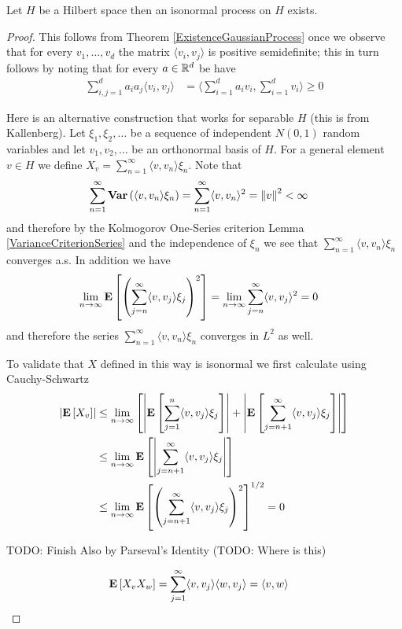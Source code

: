 \begin{prop}\label{ExistenceIsonormalProcess}Let $H$ be a Hilbert space then an isonormal process on $H$ exists.
\end{prop}
\begin{proof}
This follows from Theorem \ref{ExistenceGaussianProcess} once we observe that for every $v_1, \dotsc, v_d$ the matrix $\langle v_i, v_j \rangle$ is positive semidefinite; this in turn follows by noting that for every $a \in \mathbb{R}^d$ be have 
\begin{align*}
\sum_{i,j = 1}^d a_i a_j \langle v_i, v_j \rangle &= \langle \sum_{i=1}^d a_i v_i, \sum_{i=1}^d  v_i \rangle \geq 0
\end{align*}

Here is an alternative construction that works for separable $H$ (this is from Kallenberg).
Let $\xi_1, \xi_2, \dotsc$ be a sequence of independent $N(0,1)$ random variables and let $v_1, v_2, \dotsc$ be an orthonormal basis of $H$.  For a general element $v \in H$ we define 
$X_v = \sum_{n=1}^\infty \langle v, v_n \rangle \xi_n$.  Note that 
\begin{align*}
\sum_{n=1}^\infty \textbf{Var} \left (\langle v, v_n \rangle \xi_n \right ) 
&= \sum_{n=1}^\infty  \langle v, v_n \rangle^2 = \left \lVert v \right \rVert^2 < \infty
\end{align*}
and therefore by the Kolmogorov One-Series criterion Lemma \ref{VarianceCriterionSeries} and the independence of $\xi_n$ we see that $\sum_{n=1}^\infty \langle v, v_n \rangle \xi_n$ converges a.s.  In addition we have 
\begin{align*}
\lim_{n \to \infty} \textbf{E}\left[\left( \sum_{j=n}^\infty \langle v, v_j \rangle \xi_j \right)^2\right] 
&=\lim_{n \to \infty} \sum_{j=n}^\infty \langle v, v_j \rangle^2 = 0
\end{align*}
and therefore the series $\sum_{n=1}^\infty \langle v, v_n \rangle \xi_n$ converges in $L^2$ as well.

To validate that $X$ defined in this way is isonormal we first calculate using Cauchy-Schwartz
\begin{align*}
\left \vert \textbf{E}\left[X_v\right]  \right \vert
&\leq \lim_{n \to \infty} \left[\left \vert \textbf{E}\left[\sum_{j=1}^n \langle v, v_j \rangle \xi_j\right] \right \vert + \left \vert \textbf{E}\left[\sum_{j=n+1}^\infty \langle v, v_j \rangle \xi_j\right] \right \vert \right] \\
&\leq \lim_{n \to \infty} \textbf{E}\left[\left \vert \sum_{j=n+1}^\infty \langle v, v_j \rangle \xi_j \right \vert\right] \\
&\leq \lim_{n \to \infty} \textbf{E}\left[\left( \sum_{j=n+1}^\infty \langle v, v_j \rangle \xi_j \right )^2\right]^{1/2} = 0 \\
\end{align*}

TODO: Finish
Also  by Parseval's Identity (TODO: Where is this)

\begin{align*}
\textbf{E}\left[X_v X_w\right] 
&= \sum_{j=1}^\infty \langle v, v_j \rangle \langle w, v_j \rangle = \langle v, w \rangle
\end{align*}
\end{proof}


